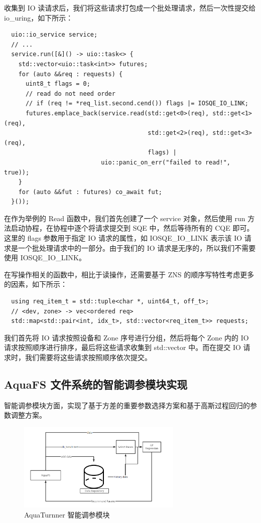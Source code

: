 收集到 IO 读请求后，我们将这些请求打包成一个批处理请求，然后一次性提交给 io\_uring，如下所示：

\begin{lstlisting}
  uio::io_service service;
  // ...
  service.run([&]() -> uio::task<> {
    std::vector<uio::task<int>> futures;
    for (auto &&req : requests) {
      uint8_t flags = 0;
      // read do not need order
      // if (req != *req_list.second.cend()) flags |= IOSQE_IO_LINK;
      futures.emplace_back(service.read(std::get<0>(req), std::get<1>(req),
                                        std::get<2>(req), std::get<3>(req),
                                        flags) |
                           uio::panic_on_err("failed to read!", true));
    }
    for (auto &&fut : futures) co_await fut;
  }());
\end{lstlisting}

在作为举例的 Read 函数中，我们首先创建了一个 service 对象，然后使用 run 方法启动协程，在协程中逐个将请求提交到 SQE 中，然后等待所有的 CQE 即可。这里的 flags 参数用于指定 IO 请求的属性，如 IOSQE\_IO\_LINK 表示该 IO 请求是一个批处理请求中的一部分。由于我们的 IO 请求是无序的，所以我们不需要使用 IOSQE\_IO\_LINK。

在写操作相关的函数中，相比于读操作，还需要基于 ZNS 的顺序写特性考虑更多的因素，如下所示：

\begin{lstlisting}
  using req_item_t = std::tuple<char *, uint64_t, off_t>;
  // <dev, zone> -> vec<ordered req>
  std::map<std::pair<int, idx_t>, std::vector<req_item_t>> requests;
\end{lstlisting}

我们首先将 IO 请求按照设备和 Zone 序号进行分组，然后将每个 Zone 内的 IO 请求按照顺序进行排序，最后将这些请求收集到 std::vector 中。而在提交 IO 请求时，我们需要将这些请求按照顺序依次提交。

\subsection{AquaFS 文件系统的智能调参模块实现}

智能调参模块方面，实现了基于方差的重要参数选择方案和基于高斯过程回归的参数调整方案。

\begin{figure}[htbp]
  \centering
  \includegraphics[width=0.7\textwidth]{fig/aquaturnner.png}
  \caption{AquaTurnner 智能调参模块}
  \label{aquaturnner}
\end{figure}

